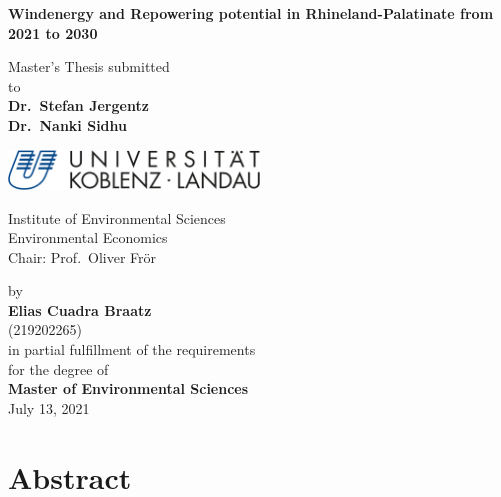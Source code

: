 \documentclass[a4paper,11pt]{article}
\begin{document}
\thispagestyle{empty}
\begin{center}
  \vspace*{5mm}
  \linespread{1.5}
  {\huge{\bf Windenergy and Repowering potential in Rhineland-Palatinate from 2021 to 2030}\par}\vspace{1cm}
  Master's Thesis submitted \\\vspace{0.5cm}
  to \\\vspace{0.5cm}
  \textbf{Dr.~Stefan Jergentz} \\
  \textbf{Dr.~Nanki Sidhu} \\\vspace{1.5cm}
  
  
  \includegraphics[width=0.5\textwidth]{Uni-Logo-2.jpg}
  
  Institute of Environmental Sciences \\
  Environmental Economics \\
   Chair: Prof.~Oliver Frör \\  \vspace{1cm}

  
  
  by \\\vspace{0.5cm}
  \textbf{Elias Cuadra Braatz} \\
  (219202265) \\
  
  \medskip
  \medskip
  in partial fulfillment of the requirements \\
  for the degree of \\
  \textbf{Master of Environmental Sciences} \\\vspace{0.5cm}
  July 13, 2021
  
\end{center}


\newpage
\tableofcontents
\clearpage

\newpage
\hypertarget{abstract}{%
\section*{Abstract}\label{abstract}}
\end{document}
